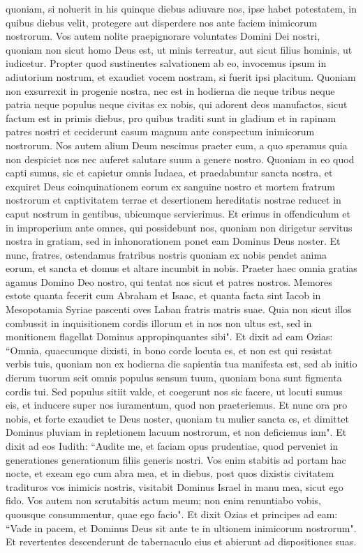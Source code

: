 \begin{biblechapter}
\verse quoniam, si noluerit in his quinque diebus adiuvare nos, ipse habet potestatem, in quibus diebus velit, protegere aut disperdere nos ante faciem inimicorum nostrorum. 
\verse Vos autem nolite praepignorare voluntates Domini Dei nostri, quoniam non sicut homo Deus est, ut minis terreatur, aut sicut filius hominis, ut iudicetur. 
\verse Propter quod sustinentes salvationem ab eo, invocemus ipsum in adiutorium nostrum, et exaudiet vocem nostram, si fuerit ipsi placitum. 
\verse Quoniam non exsurrexit in progenie nostra, nec est in hodierna die neque tribus neque patria neque populus neque civitas ex nobis, qui adorent deos manufactos, sicut factum est in primis diebus, 
\verse pro quibus traditi sunt in gladium et in rapinam patres nostri et ceciderunt casum magnum ante conspectum inimicorum nostrorum. 
\verse Nos autem alium Deum nescimus praeter eum, a quo speramus quia non despiciet nos nec auferet salutare suum a genere nostro. 
\verse Quoniam in eo quod capti sumus, sic et capietur omnis Iudaea, et praedabuntur sancta nostra, et exquiret Deus coinquinationem eorum ex sanguine nostro 
\verse et mortem fratrum nostrorum et captivitatem terrae et desertionem hereditatis nostrae reducet in caput nostrum in gentibus, ubicumque servierimus. Et erimus in offendiculum et in improperium ante omnes, qui possidebunt nos, 
\verse quoniam non dirigetur servitus nostra in gratiam, sed in inhonorationem ponet eam Dominus Deus noster. 
\verse Et nunc, fratres, ostendamus fratribus nostris quoniam ex nobis pendet anima eorum, et sancta et domus et altare incumbit in nobis. 
\verse Praeter haec omnia gratias agamus Domino Deo nostro, qui tentat nos sicut et patres nostros. 
\verse Memores estote quanta fecerit cum Abraham et Isaac, et quanta facta sint Iacob in Mesopotamia Syriae pascenti oves Laban fratris matris suae. 
\verse Quia non sicut illos combussit in inquisitionem cordis illorum et in nos non ultus est, sed in monitionem flagellat Dominus appropinquantes sibi". 
\verse Et dixit ad eam Ozias: “Omnia, quaecumque dixisti, in bono corde locuta es, et non est qui resistat verbis tuis, 
\verse quoniam non ex hodierna die sapientia tua manifesta est, sed ab initio dierum tuorum scit omnis populus sensum tuum, quoniam bona sunt figmenta cordis tui. 
\verse Sed populus sitiit valde, et coegerunt nos sic facere, ut locuti sumus eis, et inducere super nos iuramentum, quod non praeteriemus. 
\verse Et nunc ora pro nobis, et forte exaudiet te Deus noster, quoniam tu mulier sancta es, et dimittet Dominus pluviam in repletionem lacuum nostrorum, et non deficiemus iam". 
\verse Et dixit ad eos Iudith: “Audite me, et faciam opus prudentiae, quod perveniet in generationes generationum filiis generis nostri. 
\verse Vos enim stabitis ad portam hac nocte, et exeam ego cum abra mea, et in diebus, post quos dixistis civitatem tradituros vos inimicis nostris, visitabit Dominus Israel in manu mea, sicut ego fido. 
\verse Vos autem non scrutabitis actum meum; non enim renuntiabo vobis, quousque consummentur, quae ego facio". 
\verse Et dixit Ozias et principes ad eam: “Vade in pacem, et Dominus Deus sit ante te in ultionem inimicorum nostrorum". 
\verse Et revertentes descenderunt de tabernaculo eius et abierunt ad dispositiones suas. 
\end{biblechapter}

